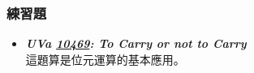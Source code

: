 \subsubsection*{練習題}
\begin{itemize}[label={\Checkmark}]
\item \textbf{\textit{UVa \href{http://uva.onlinejudge.org/external/104/10469.html}{10469}: To Carry or not to Carry}}\\
這題算是位元運算的基本應用。
\end{itemize}